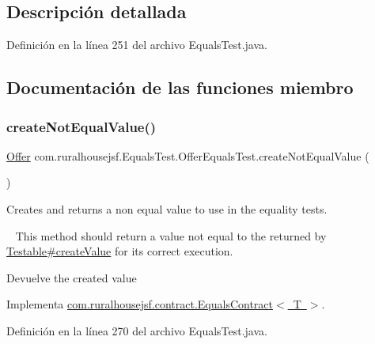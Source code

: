 \subsection{Descripción detallada}


Definición en la línea 251 del archivo Equals\+Test.\+java.



\subsection{Documentación de las funciones miembro}
\mbox{\label{classcom_1_1ruralhousejsf_1_1_equals_test_1_1_offer_equals_test_a459de0dbb86bdaa6f54b99eb887a2eab}} 
\subsubsection{\texorpdfstring{createNotEqualValue()}{createNotEqualValue()}}
{\footnotesize\ttfamily \mbox{\hyperlink{classcom_1_1ruralhousejsf_1_1domain_1_1_offer}{Offer}} com.\+ruralhousejsf.\+Equals\+Test.\+Offer\+Equals\+Test.\+create\+Not\+Equal\+Value (\begin{DoxyParamCaption}{ }\end{DoxyParamCaption})}



Creates and returns a non equal value to use in the equality tests. 

~\newline
 This method should return a value not equal to the returned by \mbox{\hyperlink{}{Testable\#create\+Value}} for its correct execution.

\begin{DoxyReturn}{Devuelve}
the created value 
\end{DoxyReturn}


Implementa \mbox{\hyperlink{interfacecom_1_1ruralhousejsf_1_1contract_1_1_equals_contract_a65840509b57f6b89e42e2abf1978aa01}{com.\+ruralhousejsf.\+contract.\+Equals\+Contract$<$ T $>$}}.



Definición en la línea 270 del archivo Equals\+Test.\+java.

